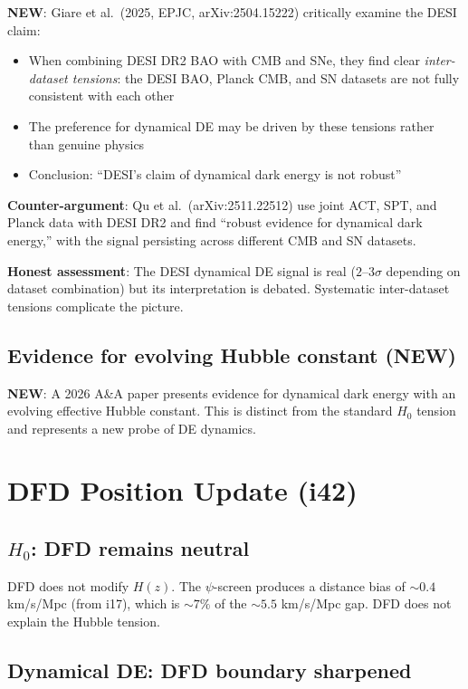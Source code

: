 \documentclass[11pt,a4paper]{article}
\newcommand{\NEW}{\textcolor{dfdblue}{\textbf{NEW}}}
\begin{document}
\textbf{\NEW}: Giare et al.\ (2025, EPJC, arXiv:2504.15222) critically examine the DESI claim:
\begin{itemize}
\item When combining DESI DR2 BAO with CMB and SNe, they find clear \emph{inter-dataset tensions}: the DESI BAO, Planck CMB, and SN datasets are not fully consistent with each other
\item The preference for dynamical DE may be driven by these tensions rather than genuine physics
\item Conclusion: ``DESI's claim of dynamical dark energy is not robust''
\end{itemize}

\textbf{Counter-argument}: Qu et al.\ (arXiv:2511.22512) use joint ACT, SPT, and Planck data with DESI DR2 and find ``robust evidence for dynamical dark energy,'' with the signal persisting across different CMB and SN datasets.

\textbf{Honest assessment}: The DESI dynamical DE signal is real ($2$--$3\sigma$ depending on dataset combination) but its interpretation is debated. Systematic inter-dataset tensions complicate the picture.

\subsection{Evidence for evolving Hubble constant (NEW)}

\textbf{\NEW}: A 2026 A\&A paper presents evidence for dynamical dark energy with an evolving effective Hubble constant. This is distinct from the standard $H_0$ tension and represents a new probe of DE dynamics.

\section{DFD Position Update (i42)}

\subsection{$H_0$: DFD remains neutral}

DFD does not modify $H(z)$. The $\psi$-screen produces a distance bias of $\sim 0.4$ km/s/Mpc (from i17), which is $\sim 7\%$ of the $\sim 5.5$ km/s/Mpc gap. DFD does not explain the Hubble tension.

\subsection{Dynamical DE: DFD boundary sharpened}
\end{document}
